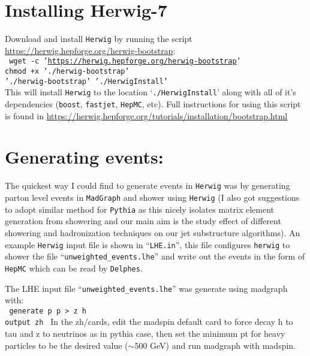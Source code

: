 \section{Installing Herwig-7}

Download and install {\tt Herwig} by running the script \url{https://herwig.hepforge.org/herwig-bootstrap}:\\
{\tt
wget -c '\url{https://herwig.hepforge.org/herwig-bootstrap}'\\
chmod +x './herwig-bootstrap'\\
'./herwig-bootstrap' './HerwigInstall'
}\\
This will install {\tt Herwig} to the location `{\tt ./HerwigInstall}' along with all of it's dependencies ({\tt boost}, {\tt fastjet}, {\tt HepMC}, etc). Full instructions for using this script is found in \url{https://herwig.hepforge.org/tutorials/installation/bootstrap.html}

\section{Generating events:}
The quickest way I could find to generate events in {\tt Herwig} was by generating parton level events in {\tt MadGraph} and shower using {\tt Herwig} (I also got suggestions to adopt similar method for {\tt Pythia} as this nicely isolates matrix element generation from showering and our main aim is the study effect of different showering and hadronization techniques on our jet substructure algorithms). An example {\tt Herwig} input file is shown in ``{\tt LHE.in}'', this file configures {\tt herwig} to shower the file ``{\tt unweighted\_events.lhe}'' and write out the events in the form of {\tt HepMC} which can be read by {\tt Delphes}.

The LHE input file ``{\tt unweighted\_events.lhe}'' was generate using madgraph with:\\
{\tt
generate p p > z h\\
output zh
}
In the zh/cards, edit the madspin default card to force decay h to tau and z to neutrinos as in pythia case, then set the minimum pt for heavy particles to be the desired value ($\sim 500$ GeV) and run madgraph with madspin.
